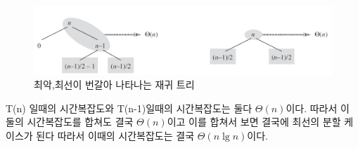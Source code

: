 \begin{figure}[h!]
    \centering
    \includegraphics[scale=0.5]{pic/q3.png}
    \caption{최악,최선이 번갈아 나타나는 재귀 트리\cite{reference1}}
\end{figure}

T(n) 일때의 시간복잡도와 T(n-1)일때의 시간복잡도는 둘다 $\Theta(n)$이다. 따라서 이 둘의 시간복잡도를 합쳐도 결국 $\Theta(n)$이고 이를 합쳐서 보면 결국에 최선의 분할 케이스가 된다 따라서 이때의 시간복잡도는 결국 $\Theta(n \lg n)$이다.
